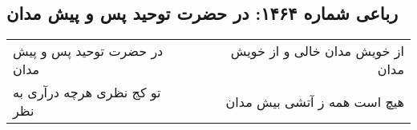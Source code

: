 \begin{center}
\section*{رباعی شماره ۱۴۶۴: در حضرت توحید پس و پیش مدان}
\label{sec:1464}
\begin{longtable}{l p{0.5cm} r}
در حضرت توحید پس و پیش مدان
&&
از خویش مدان خالی و از خویش مدان
\\
تو کج نظری هرچه درآری به نظر
&&
هیچ است همه ز آتشی بیش مدان
\\
\end{longtable}
\end{center}
